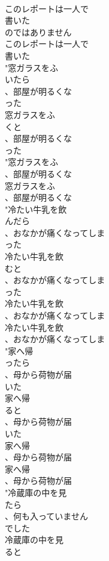 \documentclass[8pt]{extreport}
\begin{document}
\begin{CJK}{UTF8}{min}
\\	このレポートは一人で
\\	書いた
\\	のではありません
\\	このレポートは一人で
\\	書いた
\\	"窓ガラスをふ
\\	いたら
\\	、部屋が明るくな
\\	った
\\	窓ガラスをふ
\\	くと
\\	、部屋が明るくな
\\	った
\\	"窓ガラスをふ
\\	、部屋が明るくな
\\	窓ガラスをふ
\\	、部屋が明るくな
\\	"冷たい牛乳を飲
\\	んだら
\\	、おなかが痛くなってしま
\\	った
\\	冷たい牛乳を飲
\\	むと
\\	、おなかが痛くなってしま
\\	った
\\	冷たい牛乳を飲
\\	、おなかが痛くなってしま
\\	冷たい牛乳を飲
\\	、おなかが痛くなってしま
\\	"家へ帰
\\	ったら
\\	、母から荷物が届
\\	いた
\\	家へ帰
\\	ると
\\	、母から荷物が届
\\	いた
\\	家へ帰
\\	、母から荷物が届
\\	家へ帰
\\	、母から荷物が届
\\	"冷蔵庫の中を見
\\	たら
\\	、何も入っていません
\\	でした
\\	冷蔵庫の中を見
\\	ると

\end{CJK}
\end{document}
